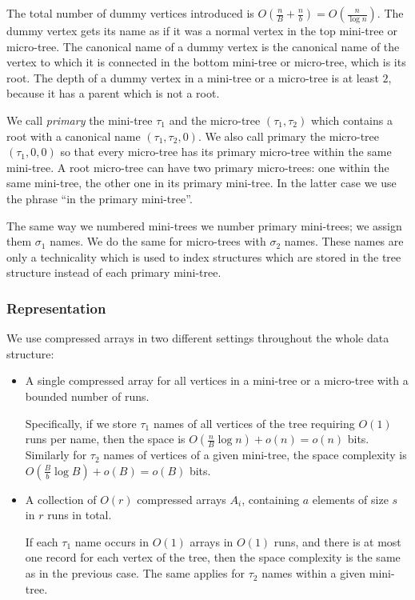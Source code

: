 The total number of dummy vertices introduced is $O\left(\frac{n}{B} + \frac{n}{b}\right) = O\left(\frac{n}{\log n}\right)$.
The dummy vertex gets its name as if it was a normal vertex in the top mini-tree or micro-tree.
The canonical name of a dummy vertex is the canonical name of the vertex to which it is connected in the bottom mini-tree or micro-tree, which is its root.
The depth of a dummy vertex in a mini-tree or a micro-tree is at least $2$, because it has a parent which is not a root.

\bigbreak

We call \emph{primary} the mini-tree $\tau_1$ and the micro-tree $(\tau_1, \tau_2)$ which contains a root with a canonical name $(\tau_1, \tau_2, 0)$.
We also call primary the micro-tree $(\tau_1, 0, 0)$ so that every micro-tree has its primary micro-tree within the same mini-tree.
A root micro-tree can have two primary micro-trees: one within the same mini-tree, the other one in its primary mini-tree.
In the latter case we use the phrase ``in the primary mini-tree''.

The same way we numbered mini-trees we number primary mini-trees; we assign them $\sigma_1$ names.
We do the same for micro-trees with $\sigma_2$ names.
These names are only a technicality which is used to index structures which are stored in the tree structure instead of each primary mini-tree.

\subsubsection{Representation}

We use compressed arrays in two different settings throughout the whole data structure:
\begin{itemize}
	\item A single compressed array for all vertices in a mini-tree or a micro-tree with a bounded number of runs.
	
	Specifically, if we store $\tau_1$ names of all vertices of the tree requiring $O(1)$ runs per name, then the space is $O\left(\frac{n}{B} \log n\right) + o(n) = o(n)$ bits.
	Similarly for $\tau_2$ names of vertices of a given mini-tree, the space complexity is $O\left(\frac{B}{b} \log B\right) + o(B) = o(B)$ bits.
	
	\item A collection of $O(r)$ compressed arrays $A_i$, containing $a$ elements of size $s$ in $r$ runs in total.
	
	If each $\tau_1$ name occurs in $O(1)$ arrays in $O(1)$ runs, and there is at most one record for each vertex of the tree, then the space complexity is the same as in the previous case.
	The same applies for $\tau_2$ names within a given mini-tree.
\end{itemize}

